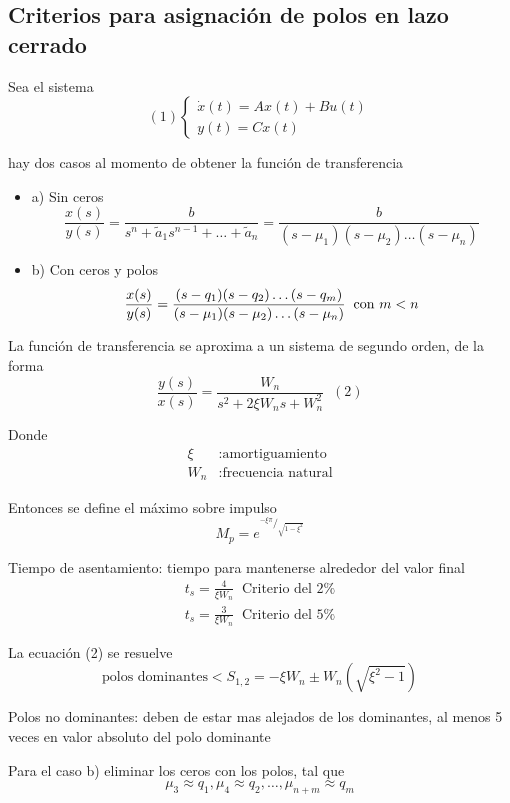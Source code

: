 \subsection{Criterios para asignación de polos en lazo cerrado}

Sea el sistema
\[
    (1)
    \left\{
        \begin{array}{lll}
            \dot{x}(t) = Ax(t) + Bu(t)\\
            y(t) = Cx(t)
        \end{array}
    \right.
\]

hay dos casos al momento de obtener la función de transferencia

\begin{itemize}
    \item a) Sin ceros
    \[
        \frac{x(s)}{y(s)} = \frac{b}{s^{n} + \tilde{a}_{1}s^{n-1} + \ldots + \tilde{a}_{n}} = \frac{b}{(s-\mu_{1})(s-\mu_{2})\ldots(s-\mu_{n})}
    \]
    \item b) Con ceros y polos
    \[
        \frac{x(s)}{y(s)} = \frac{(s-q_{1}) (s-q_{2}) \ldots (s-q_{m})}{(s-\mu_{1})(s-\mu_{2})\ldots(s-\mu_{n})} \;\; \text{con \( m < n \)}
    \]
    
\end{itemize}

La función de transferencia se aproxima a un sistema de segundo orden, de la forma
\[
    \frac{y(s)}{x(s)} = \frac{W_{n}}{s^{2} +2 \xi W_{n}s + W_{n}^{2} } \;\; (2)
\]

Donde 
\[
    \begin{split}
        \xi & : \text{amortiguamiento} \\
        W_{n} & : \text{frecuencia natural}
    \end{split}
\]

Entonces se define el máximo sobre impulso
\[
    M_{p} = e^{^{- \xi \pi}/_{\sqrt{1 - \xi^{2}}}}
\]

Tiempo de asentamiento: tiempo para mantenerse alrededor del valor final
\[
    \begin{split}
        t_{s} = \frac{4}{\xi W_{n}} \;\; \text{Criterio del 2\%} \\
        t_{s} = \frac{3}{\xi W_{n}} \;\; \text{Criterio del 5\%}
    \end{split}
\]

La ecuación (2) se resuelve 
\[
    \text{polos dominantes} < S_{1,2} = -\xi W_{n} \pm W_{n}(\sqrt{\xi^{2} - 1})
\]

Polos no dominantes: deben de estar mas alejados de los dominantes, al menos 5 veces en valor absoluto del polo dominante

Para el caso b) eliminar los ceros con los polos, tal que
\[
    \mu_{3} \approx q_{1}, \mu_{4} \approx q_{2}, \ldots,
     \mu_{n+m} \approx q_{m} 
\]
